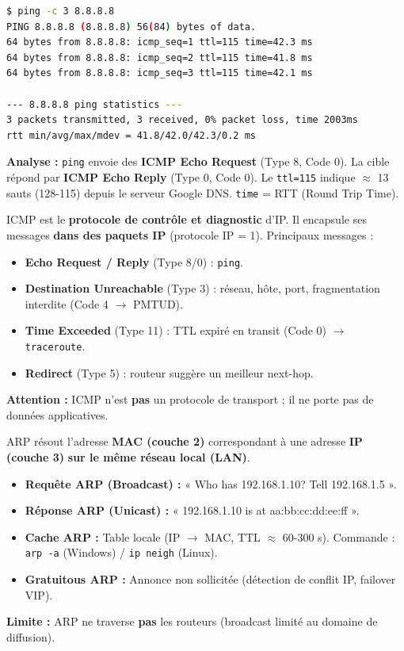 \documentclass[11pt]{article}
\begin{document}
\begin{exemplebox}
\begin{lstlisting}[language=bash]
$ ping -c 3 8.8.8.8
PING 8.8.8.8 (8.8.8.8) 56(84) bytes of data.
64 bytes from 8.8.8.8: icmp_seq=1 ttl=115 time=42.3 ms
64 bytes from 8.8.8.8: icmp_seq=2 ttl=115 time=41.8 ms
64 bytes from 8.8.8.8: icmp_seq=3 ttl=115 time=42.1 ms

--- 8.8.8.8 ping statistics ---
3 packets transmitted, 3 received, 0% packet loss, time 2003ms
rtt min/avg/max/mdev = 41.8/42.0/42.3/0.2 ms
\end{lstlisting}
\textbf{Analyse :} \texttt{ping} envoie des \textbf{ICMP Echo Request} (Type 8, Code 0). La cible répond par \textbf{ICMP Echo Reply} (Type 0, Code 0). Le \texttt{ttl=115} indique $\approx$ 13 sauts (128-115) depuis le serveur Google DNS. \texttt{time} = RTT (Round Trip Time).
\end{exemplebox}

\begin{propriete}
ICMP est le \textbf{protocole de contrôle et diagnostic} d'IP. Il encapsule ses messages \textbf{dans des paquets IP} (protocole IP = 1). Principaux messages :
\begin{itemize}
    \item \textbf{Echo Request / Reply} (Type 8/0) : \texttt{ping}.
    \item \textbf{Destination Unreachable} (Type 3) : réseau, hôte, port, fragmentation interdite (Code 4 $\to$ PMTUD).
    \item \textbf{Time Exceeded} (Type 11) : TTL expiré en transit (Code 0) $\to$ \texttt{traceroute}.
    \item \textbf{Redirect} (Type 5) : routeur suggère un meilleur next-hop.
\end{itemize}
\textbf{Attention :} ICMP n'est \textbf{pas} un protocole de transport ; il ne porte pas de données applicatives.
\end{propriete}

\begin{propriete}
ARP résout l'adresse \textbf{MAC (couche 2)} correspondant à une adresse \textbf{IP (couche 3)} \textbf{sur le même réseau local (LAN)}.
\begin{itemize}
    \item \textbf{Requête ARP (Broadcast) :} « Who has 192.168.1.10? Tell 192.168.1.5 ».
    \item \textbf{Réponse ARP (Unicast) :} « 192.168.1.10 is at aa:bb:cc:dd:ee:ff ».
    \item \textbf{Cache ARP :} Table locale (IP $\to$ MAC, TTL $\approx$ 60-300 s). Commande : \texttt{arp -a} (Windows) / \texttt{ip neigh} (Linux).
    \item \textbf{Gratuitous ARP :} Annonce non sollicitée (détection de conflit IP, failover VIP).
\end{itemize}
\textbf{Limite :} ARP ne traverse \textbf{pas} les routeurs (broadcast limité au domaine de diffusion).
\end{propriete}
\end{document}
